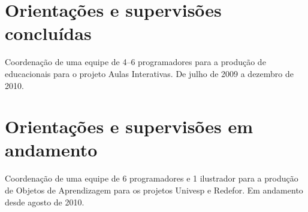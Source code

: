 \section*{Orientações e supervisões concluídas}

\begin{compactitem}
	\item Coordenação de uma equipe de 4--6 programadores para a produção de  educacionais para o projeto Aulas Interativas. De julho de 2009 a dezembro de 2010.
\end{compactitem}

\section*{Orientações e supervisões em andamento}

\begin{compactitem}
	\item Coordenação de uma equipe de 6 programadores e 1 ilustrador para a produção de Objetos de Aprendizagem para os projetos Univesp e Redefor. Em andamento desde agosto de 2010.
\end{compactitem}


